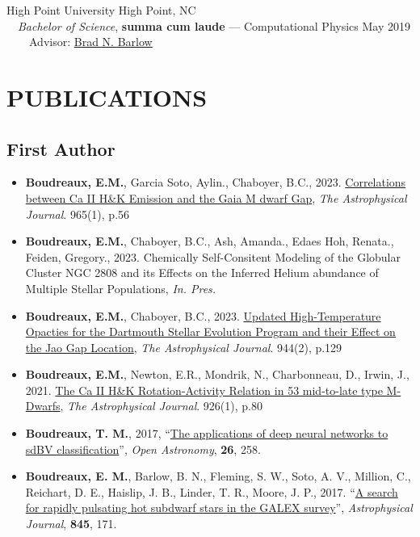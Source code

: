 \documentclass[margin, 10pt]{res} %
\begin{document}
\begin{resume}
{\large High Point University} \hfill High Point, NC\\
	{\-\ \-\ \small \textit{Bachelor of Science}, \textbf{summa cum laude} --- Computational Physics} \hfill May 2019\\
  {\-\ \-\ \-\ \-\ \small Advisor: \href{https://tarheels.live/bbarlow/}{Brad N. Barlow}} \\

\section{PUBLICATIONS}
\subsection{First Author}
\begin{itemize}
  \item \textbf{Boudreaux, E.M.}, Garcia Soto, Aylin., Chaboyer, B.C., 2023. \href{https://ui.adsabs.harvard.edu/abs/2024arXiv240214984B/abstract}{Correlations between Ca II H\&K Emission and the Gaia M dwarf Gap}, \textit{The Astrophysical Journal}. 965(1), p.56
  \item \textbf{Boudreaux, E.M.}, Chaboyer, B.C., Ash, Amanda., Edaes Hoh, Renata., Feiden, Gregory., 2023. Chemically Self-Consitent Modeling of the Globular Cluster NGC 2808 and its Effects on the Inferred Helium abundance of Multiple Stellar Populations, \textit{In. Pres.}
	\item \textbf{Boudreaux, E.M.}, Chaboyer, B.C., 2023. \href{https://ui.adsabs.harvard.edu/abs/2023arXiv230110798B/abstract}{Updated High-Temperature Opacties for the Dartmouth Stellar Evolution Program and their Effect on the Jao Gap Location}, \textit{The Astrophysical Journal}. 944(2), p.129
	\item \textbf{Boudreaux, E.M.}, Newton, E.R., Mondrik, N., Charbonneau, D., Irwin, J., 2021. \href{https://ui.adsabs.harvard.edu/abs/2022ApJ...929...80B/abstract}{The Ca II H\&K Rotation-Activity Relation in 53 mid-to-late type M-Dwarfs}, \textit{The Astrophysical Journal}. 926(1), p.80
\item \textbf{Boudreaux, T. M.}, 2017, ``\href{https://ui.adsabs.harvard.edu/#abs/2017OAst...26..258B/abstract}{The applications of deep neural networks to sdBV classification}'', \textit{Open Astronomy}, \textbf{26}, 258.
\item \textbf{Boudreaux, E. M.}, Barlow, B. N., Fleming, S. W., Soto, A. V., Million, C., Reichart, D. E., Haislip, J. B., Linder, T. R., Moore, J. P., 2017. ``\href{https://ui.adsabs.harvard.edu/#abs/2017ApJ...845..171B/abstract}{A search for rapidly pulsating hot subdwarf stars in the GALEX survey}'', \textit{Astrophysical Journal}, \textbf{845}, 171.
\end{itemize}

\end{resume}
\end{document}
